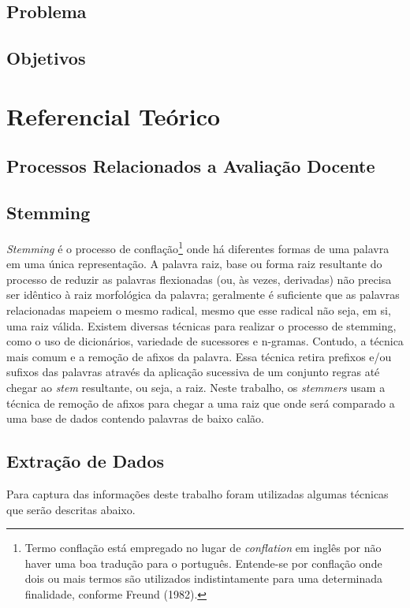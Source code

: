 \documentclass[12pt, a4paper]{report}
\begin{document}
\section{Problema}
\label{sec:problema}
\section{Objetivos}
\label{sec:obejtivos}
\chapter {Referencial Teórico}
\section {Processos Relacionados a Avaliação Docente}
\section {Stemming}
 \emph{Stemming} é o processo de conflação\footnote{Termo conflação está empregado no lugar de \emph{conflation} em inglês por não haver uma boa tradução para o português. Entende-se por conflação onde dois ou mais termos são utilizados indistintamente para uma determinada finalidade, conforme Freund (1982).} 
onde há diferentes formas de uma palavra em uma única representação.
A palavra raiz, base ou forma raiz resultante do processo de reduzir as palavras flexionadas (ou, às vezes, derivadas) não precisa ser idêntico à raiz morfológica da palavra; geralmente é suficiente que as palavras relacionadas mapeiem o mesmo radical, mesmo que esse radical não seja, em si, uma raiz válida.
Existem diversas técnicas para realizar o processo de stemming, como o uso de dicionários, variedade de sucessores e n-gramas. Contudo, a técnica mais comum e a remoção de afixos da palavra. Essa técnica retira prefixos e/ou sufixos das palavras através da aplicação sucessiva de um conjunto regras até chegar ao \emph{stem} resultante, ou seja, a raiz. Neste trabalho, os \emph{stemmers} usam a técnica de remoção de afixos para chegar a uma raiz que onde será comparado a uma base de dados contendo palavras de baixo calão.   

\section {Extração de Dados}
Para captura das informações deste trabalho foram utilizadas algumas técnicas que serão descritas abaixo.
\end{document}
